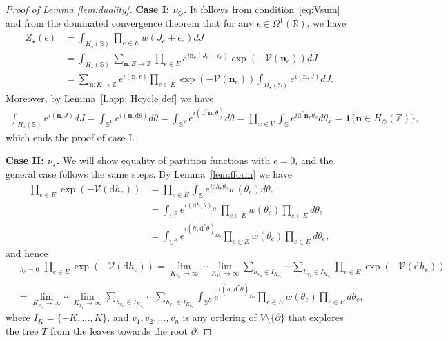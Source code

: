 \documentclass[11pt, reqno]{amsart}
\numberwithin{equation}{section}
\theoremstyle{definition}
\theoremstyle{remark}
\newcommand{\ZZ}{\mathbb{Z}}
\renewcommand{\d}{\mathrm{d}}
\renewcommand{\c}[1]{\ensuremath{\mathcal{#1}}}
\newcommand{\J}{J}
\newcommand{\n}{\mathbf{n}}
\newcommand{\exact}{\star}
\newcommand{\coclosed}{\Diamond}
\newcommand{\Hcycle}{\ensuremath{H_{\star}}}
\begin{document}
\begin{proof}[Proof of Lemma \ref{lem:duality}]
	\textbf{Case I: $\nu_{\coclosed}$.} 
		It follows from condition~\ref{eq:Vsum} and from the dominated convergence theorem that for any $\epsilon \in \Omega^1(\mathbb R)$, we have
	\begin{align*}
		Z_{\exact}(\epsilon) &= \int_{H_{\exact}(\mathbb{S})} \prod_{e \in E} w(\J_e + \epsilon_e) d \J \\
		&= \int_{H_{\exact}(\mathbb{S})} \sum_{\n: E \to \ZZ} \prod_{e \in E} e^{i \n_e(\J_e + \epsilon_e)} \exp(-\c{V}(\n_e)) d \J \\
		&= \sum_{\n: E \to \ZZ} e^{i (\n, \epsilon)}\prod_{e \in E}\exp(-\c{V}(\n_e)) \int_{H_{\exact}(\mathbb{S})} e^{ i (\n, \J)} d \J. 
	\end{align*}
	Moreover, by Lemma~\ref{Lapp: Hcycle def} we have
	\begin{align*}
		\int_{\Hcycle(\mathbb{S})} e^{i(\n, \J)} d \J = \int_{\mathbb{S}^V} e^{i(\n, \d \theta)} d \theta 
		= \int_{\mathbb{S}^V} e^{i(\d^*\n, \theta)} d \theta = \prod_{x \in V} \int_{\mathbb{S}} e^{i \d^*\n_x\theta_x} d \theta_x = \mathbf 1\{ \n \in H_{\coclosed} (\mathbb Z)\},
	\end{align*}
	which ends the proof of case I.
	
	\textbf{Case II: $\nu_{\exact}$.} We will show equality of partition functions with $\epsilon =0$, and the general case follows the same steps. By Lemma~\ref{lem:fform} we have
	\begin{align*}
		\prod_{e \in E} \exp(-\mathcal V(\d h_e)) &=  \prod_{e \in E} \int_{\mathbb S} e^{ i \d h_e \theta_e}w(\theta_e){d} \theta_e \\
		&= \int_{\mathbb S^E}  e^{ i (\d h, \theta)_{\Omega_1}} \prod_{e \in E}w(\theta_e)\prod_{e \in E}{d} \theta_e \\
		&= \int_{\mathbb S^E}  e^{ i (h, \d^*\theta)_{\Omega_0}} \prod_{e \in E}w(\theta_e)\prod_{e \in E} {d}\theta_e,	
	\end{align*}
	and hence
	\begin{align}
	&\mathop{\sum_{h: V\to \mathbb Z}}_{h_\partial =0} \prod_{e \in E} \exp(-\mathcal V(\d h_e))  = \lim_{K_{v_n}\to \infty} \cdots  \lim_{K_{v_1}\to \infty}\nonumber
	 \sum_{h_{v_n}\in I_{K_{v_n}}}\cdots \sum_{h_{v_1}\in I_{K_{v_1}}} \prod_{e \in E}\exp(-\mathcal V(\d h_e)) \nonumber \\
	 &=  \lim_{K_{v_n}\to \infty} \cdots  \lim_{K_{v_1}\to \infty} \sum_{h_{v_n}\in I_{K_{v_n}}}\cdots \sum_{h_{v_1}\in I_{K_{v_1}}} \int_{\mathbb S^E}  e^{i (h, \d^*\theta)_{\Omega_0}} \prod_{e \in E}w(\theta_e)\prod_{e \in E} {d}\theta_e, \label{eq:bigone}
	\end{align}
	where $I_K=\{-K,\ldots,K\}$, and $v_1, v_2, \ldots, v_n$ is any ordering of $V\setminus \{\partial\}$ that explores the tree $T$ from the leaves towards the root $\partial$.
	

\end{proof}
\end{document}
